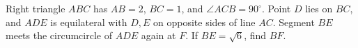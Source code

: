 Right triangle $ABC$ has $AB=2$, $BC=1$, and $\angle ACB=90^\circ$. Point $D$ lies on $BC$, and $ADE$ is equilateral with $D,E$ on opposite sides of line $AC$. Segment $BE$ meets the circumcircle of $ADE$ again at $F$. If $BE=\sqrt6$, find $BF$.
